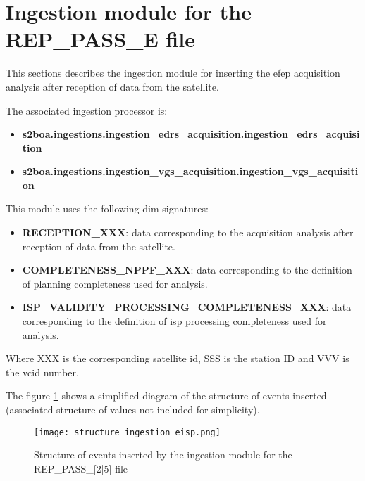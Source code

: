 \section{Ingestion module for the REP\_PASS\_E file}

This sections describes the ingestion module for inserting the \acrshort{efep} acquisition analysis after reception of data from the satellite.

The associated ingestion processor is:

\begin{itemize} 

\item \textbf{s2boa.ingestions.ingestion\_edrs\_acquisition.ingestion\_edrs\_acquisition}

\item \textbf{s2boa.ingestions.ingestion\_vgs\_acquisition.ingestion\_vgs\_acquisition}
  
\end{itemize}

This module uses the following \acrshort{dim} signatures:

\begin{itemize} 

\item \textbf{RECEPTION\_XXX}: data corresponding to the acquisition analysis after reception of data from the satellite.

\item \textbf{COMPLETENESS\_NPPF\_XXX}: data corresponding to the definition of planning completeness used for analysis.

\item \textbf{ISP\_VALIDITY\_PROCESSING\_COMPLETENESS\_XXX}: data corresponding to the definition of \acrshort{isp} processing completeness used for analysis.

\end{itemize}

Where XXX is the corresponding satellite id, SSS is the station ID and VVV is the \acrshort{vcid} number.

The figure \ref{fg:structure_ingestion_eisp} shows a simplified diagram of the structure of events inserted (associated structure of values not included for simplicity).

\begin{figure}[H]
  \begin{center}
	\centering\texttt{[image: structure\_ingestion\_eisp.png]}
	\caption{Structure of events inserted by the ingestion module for the REP\_PASS\_[2|5] file}
	\label{fg:structure_ingestion_eisp}
  \end{center}
\end{figure}

